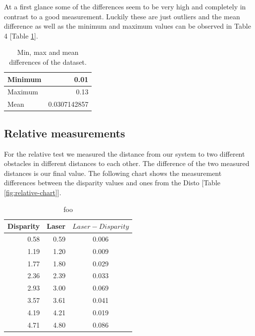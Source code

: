 \documentclass[11pt]{article}
\begin{document}
At a first glance some of the differences seem to be very high and completely in contrast to a good measurement. Luckily these are just outliers and the mean difference as well as the minimum and maximum values can be observed in Table 4 [Table \ref{table:absolute-results}].

\begin{table}[htbp]
	\begin{center}
	\begin{tabular}{|l|r|}
	\hline
	Minimum & 0.01 \\ \hline
	Maximum & 0.13 \\ \hline
	Mean & 0.0307142857 \\ \hline
	\end{tabular}
	\end{center}
	\caption{Min, max and mean differences of the dataset.}
	\label{table:absolute-results}
\end{table}

\subsection{Relative measurements}
For the relative test we measured the distance from our system to two different obstacles in different distances to each other. The difference of the two measured distances is our final value. The following chart shows the measurement differences between the disparity values and ones from the Disto [Table \ref{fig:relative-chart}].

\begin{table}[htbp]
	\begin{center}
	\begin{tabular}{|r|r|c|}
	\hline
	\multicolumn{1}{|l|}{Disparity} & \multicolumn{1}{l|}{Laser} & \multicolumn{1}{l|}{$Laser - Disparity$} \\ \hline
	0.58 & 0.59 & 0.006 \\ \hline
	1.19 & 1.20 & 0.009 \\ \hline
	1.77 & 1.80 & 0.029 \\ \hline
	2.36 & 2.39 & 0.033 \\ \hline
	2.93 & 3.00 & 0.069 \\ \hline
	3.57 & 3.61 & 0.041 \\ \hline
	4.19 & 4.21 & 0.019 \\ \hline
	4.71 & 4.80 & 0.086 \\ \hline
	\end{tabular}
	\end{center}
	\caption{foo}
	\label{table:relative-table}
\end{table}
\end{document}
